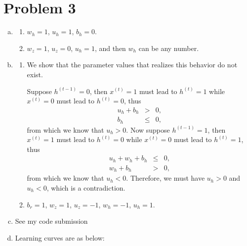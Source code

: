 \documentclass[11pt, oneside]{article}      %
\newcommand{\hasPageBreak}{}
\begin{document}
\section*{Problem 3}
\begin{enumerate}   [(a)]
\item 
\begin{enumerate}   [i]
\item $w_h = 1$, $u_h = 1$, $b_h = 0$.
\item $w_z = 1$, $u_z = 0$, $u_h = 1$, and then $w_h$ can be any number.
\end{enumerate}






\hasPageBreak
\item
\begin{enumerate}   [i]
\item 
We show that the parameter values that realizes this  behavior do not exist. 

Suppose $h^{(t-1)} = 0$, then $x^{(t)} = 1$ must lead to $h^{(t)} = 1$ while $x^{(t)} = 0$ must lead to $h^{(t)} = 0$, thus
\begin{eqnarray*}
u_h + b_h &>& 0,
\\
b_h &\leq& 0,
\end{eqnarray*}
from which we know that $u_h > 0$. Now suppose $h^{(t-1)} = 1$, then $x^{(t)} = 1$ must lead to $h^{(t)} = 0$ while $x^{(t)} = 0$ must lead to $h^{(t)} = 1$, thus
\begin{eqnarray*}
u_h + w_h + b_h &\leq& 0,
\\
w_h + b_h &>& 0,
\end{eqnarray*}
from which we know that $u_h < 0$. Therefore, we must have $u_h > 0$ and $u_h < 0$, which is a contradiction.



\item
$b_r = 1$, $w_z = 1$, $u_z = -1$, $w_h = -1$, $u_h = 1$.
\end{enumerate}


\item
See my code submission


\hasPageBreak
\item Learning curves are as below:


\end{enumerate}
\end{document}
